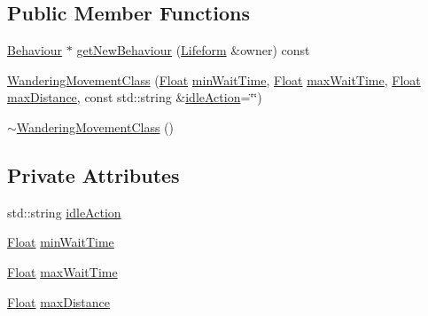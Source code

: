 \subsection*{Public Member Functions}
\begin{DoxyCompactItemize}
\item 
\hyperlink{classZeta_1_1Behaviour}{Behaviour} $\ast$ \hyperlink{classZeta_1_1WanderingMovementClass_a3b2cfba3c84bd5cdd892c09d8fd8a0fd}{get\+New\+Behaviour} (\hyperlink{classZeta_1_1Lifeform}{Lifeform} \&owner) const 
\item 
\hyperlink{classZeta_1_1WanderingMovementClass_a3d44b7e45aa291988e51881470a4b957}{Wandering\+Movement\+Class} (\hyperlink{namespaceZeta_a1e0a1265f9b3bd3075fb0fabd39088ba}{Float} \hyperlink{classZeta_1_1WanderingMovementClass_aee8968ff6eeb6249748f20c71805de81}{min\+Wait\+Time}, \hyperlink{namespaceZeta_a1e0a1265f9b3bd3075fb0fabd39088ba}{Float} \hyperlink{classZeta_1_1WanderingMovementClass_ae97392211202f727957d23418c46402d}{max\+Wait\+Time}, \hyperlink{namespaceZeta_a1e0a1265f9b3bd3075fb0fabd39088ba}{Float} \hyperlink{classZeta_1_1WanderingMovementClass_abc4c3a8c1cf7f51c15d148e7ae86038f}{max\+Distance}, const std\+::string \&\hyperlink{classZeta_1_1WanderingMovementClass_a2db670eea2c6217c3d91647d8172776e}{idle\+Action}=\char`\"{}\char`\"{})
\item 
\hyperlink{classZeta_1_1WanderingMovementClass_a4da93ad1ac5ceaa57d2e031498ce7eb3}{$\sim$\+Wandering\+Movement\+Class} ()
\end{DoxyCompactItemize}
\subsection*{Private Attributes}
\begin{DoxyCompactItemize}
\item 
std\+::string \hyperlink{classZeta_1_1WanderingMovementClass_a2db670eea2c6217c3d91647d8172776e}{idle\+Action}
\item 
\hyperlink{namespaceZeta_a1e0a1265f9b3bd3075fb0fabd39088ba}{Float} \hyperlink{classZeta_1_1WanderingMovementClass_aee8968ff6eeb6249748f20c71805de81}{min\+Wait\+Time}
\item 
\hyperlink{namespaceZeta_a1e0a1265f9b3bd3075fb0fabd39088ba}{Float} \hyperlink{classZeta_1_1WanderingMovementClass_ae97392211202f727957d23418c46402d}{max\+Wait\+Time}
\item 
\hyperlink{namespaceZeta_a1e0a1265f9b3bd3075fb0fabd39088ba}{Float} \hyperlink{classZeta_1_1WanderingMovementClass_abc4c3a8c1cf7f51c15d148e7ae86038f}{max\+Distance}
\end{DoxyCompactItemize}


